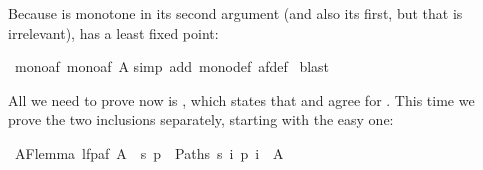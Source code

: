 \begin{isabellebody}
\begin{isamarkuptext}%
\noindent
Because  is monotone in its second argument (and also its first, but
that is irrelevant),  has a least fixed point:%
\end{isamarkuptext}%
\isamarkuptrue%
\isamarkupfalse%
\ mono{}af{}\ {}mono{}af\ A{}{}\isanewline
%
\isadelimproof
%
\endisadelimproof
%
\isatagproof
{}\isamarkupfalse%
{}simp\ add{}\ mono{}def\ af{}def{}\isanewline
{}\isamarkupfalse%
\ blast\isanewline
{}\isamarkupfalse%
%
\endisatagproof
{\isafoldproof}%
%
\isadelimproof
%
\endisadelimproof
%
\isadelimproof
%
\endisadelimproof
%
\isatagproof
%
\endisatagproof
{\isafoldproof}%
%
\isadelimproof
%
\endisadelimproof
%
\isadelimproof
%
\endisadelimproof
%
\isatagproof
%
\endisatagproof
{\isafoldproof}%
%
\isadelimproof
%
\endisadelimproof
%
\begin{isamarkuptext}%
All we need to prove now is  , which states
that  and  agree for \@.
This time we prove the two inclusions separately, starting
with the easy one:%
\end{isamarkuptext}%
\isamarkuptrue%
\isamarkupfalse%
\ AF{}lemma{}{}\ {}lfp{}af\ A{}\ {}\ {}s{}\ {}p\ {}\ Paths\ s{}\ {}i{}\ p\ i\ {}\ A{}{}%

\end{isabellebody}
